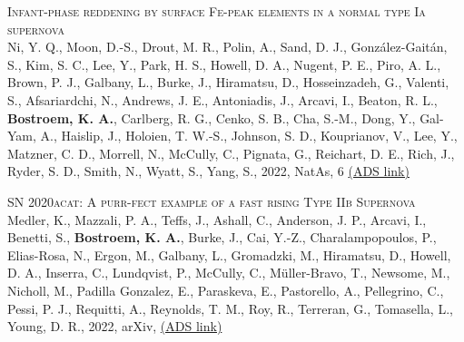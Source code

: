 \begin{revnumerate}[67]
    \item{\textsc{Infant-phase reddening by surface Fe-peak elements in a normal type Ia supernova}\\ 
    Ni, Y. Q., Moon, D.-S., Drout, M. R., Polin, A., Sand, D. J., Gonz\'{a}lez-Gait\'{a}n, S., Kim, S. C., Lee, Y., Park, H. S., Howell, D. A., Nugent, P. E., Piro, A. L., Brown, P. J., Galbany, L., Burke, J., Hiramatsu, D., Hosseinzadeh, G., Valenti, S., Afsariardchi, N., Andrews, J. E., Antoniadis, J., Arcavi, I., Beaton, R. L., \textbf{Bostroem, K. A.}, Carlberg, R. G., Cenko, S. B., Cha, S.-M., Dong, Y., Gal-Yam, A., Haislip, J., Holoien, T. W.-S., Johnson, S. D., Kouprianov, V., Lee, Y., Matzner, C. D., Morrell, N., McCully, C., Pignata, G., Reichart, D. E., Rich, J., Ryder, S. D., Smith, N., Wyatt, S., Yang, S., 2022, NatAs, 6 
    \color{blue}\href{https://ui.adsabs.harvard.edu/abs/2022NatAs...6..568N}{(ADS link)}\color{black}}\\
    
    \item{\textsc{SN 2020acat: A purr-fect example of a fast rising Type IIb Supernova}\\ 
    Medler, K., Mazzali, P. A., Teffs, J., Ashall, C., Anderson, J. P., Arcavi, I., Benetti, S., \textbf{Bostroem, K. A.}, Burke, J., Cai, Y.-Z., Charalampopoulos, P., Elias-Rosa, N., Ergon, M., Galbany, L., Gromadzki, M., Hiramatsu, D., Howell, D. A., Inserra, C., Lundqvist, P., McCully, C., Müller-Bravo, T., Newsome, M., Nicholl, M., Padilla Gonzalez, E., Paraskeva, E., Pastorello, A., Pellegrino, C., Pessi, P. J., Requitti, A., Reynolds, T. M., Roy, R., Terreran, G., Tomasella, L., Young, D. R., 2022, arXiv, 
    \color{blue}\href{https://ui.adsabs.harvard.edu/abs/2022arXiv220106991M}{(ADS link)}\color{black}}\\
    

\end{revnumerate}
